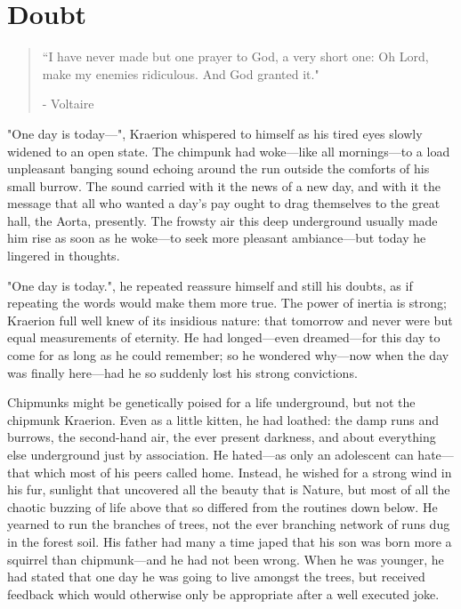 \chapter{Doubt}

\vspace{-1.3cm}
\begin{localsize}{10}
	\begin{quote}
		“I have never made but one prayer to God, a very short one: Oh Lord, make my enemies ridiculous. And God granted it."
		\begin{flushright}- Voltaire \end{flushright}
	\end{quote}
\end{localsize}
\vspace{1cm}


"One day is today---", Kraerion whispered to himself as his tired eyes slowly widened to an open state. The chimpunk had woke---like all mornings---to a load unpleasant banging sound echoing around the run outside the comforts of his small burrow. The sound carried with it the news of a new day, and with it the message that all who wanted a day's pay ought to drag themselves to the great hall, the Aorta, presently. The frowsty air this deep underground usually made him rise as soon as he woke---to seek more pleasant ambiance---but today he lingered in thoughts.

"One day is today.", he repeated reassure himself and still his doubts, as if repeating the words would make them more true. The power of inertia is strong; Kraerion full well knew of its insidious nature: that tomorrow and never were but equal measurements of eternity. He had longed---even dreamed---for this day to come for as long as he could remember; so he wondered why---now when the day was finally here---had he so suddenly lost his strong convictions.

Chipmunks might be genetically poised for a life underground, but not the chipmunk Kraerion. Even as a little kitten, he had loathed: the damp runs and burrows, the second-hand air, the ever present darkness, and about everything else underground just by association. He hated---as only an adolescent can hate---that which most of his peers called home.
Instead, he wished for a strong wind in his fur, sunlight that uncovered all the beauty that is Nature, but most of all the chaotic buzzing of life above that so differed from the routines down below. He yearned to run the branches of trees, not the ever branching network of runs dug in the forest soil. His father had many a time japed that his son was born more a squirrel than chipmunk---and he had not been wrong. When he was younger, he had stated that one day he was going to live amongst the trees, but received feedback which would otherwise only be appropriate after a well executed joke.

